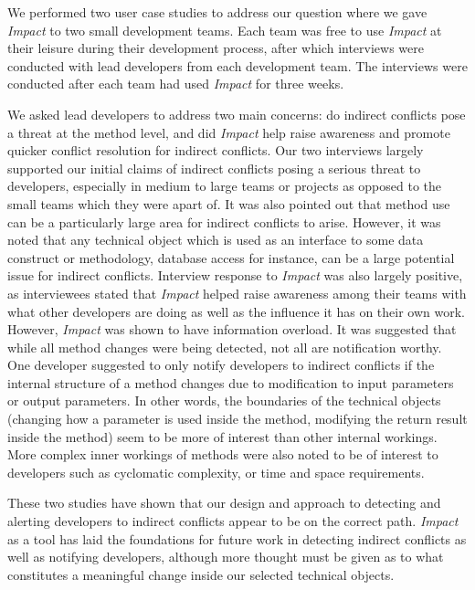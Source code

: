 \documentclass[conference]{IEEEtran}
\begin{document}
We performed two user case studies to address our question where
we gave \textit{Impact} to two small development teams. Each team was
free to use \textit{Impact} at their leisure during their development process,
after which interviews were conducted with lead developers from 
each development team. The interviews were conducted after each
team had used \textit{Impact} for three weeks.

We asked lead developers to address two main concerns: do indirect
conflicts pose a threat at the method level, and did \textit{Impact} help raise
awareness and promote quicker conflict resolution for indirect
conflicts. Our two interviews largely supported our initial claims of
indirect conflicts posing a serious threat to developers, especially
in medium to large teams or projects as opposed to the small
teams which they were apart of. It was also pointed
out that method use can be a particularly large area for indirect
conflicts to arise. However, it was noted that
any technical object which is used as an interface to some data
construct or methodology, database access for instance, can be 
a large potential issue for indirect conflicts.  Interview response to
\textit{Impact} was also largely positive, as interviewees stated that \textit{Impact}
helped raise awareness among their teams with what other developers
are doing as well as the influence it has on their own work. However,
\textit{Impact} was shown to have information overload. It was suggested
that while all method changes were being detected,
not all are notification worthy. One developer suggested to only notify
developers to indirect conflicts if the internal structure of a method
changes due to modification to input parameters or output parameters.
In other words, the boundaries of the technical objects (changing
how a parameter is used inside the method, modifying the return
result inside the method) seem to be more of interest than other 
internal workings. More complex inner workings of methods were also noted 
to be of interest to developers
such as cyclomatic complexity, or time and space requirements.

These two studies have shown that our design and approach to
detecting and alerting developers to indirect conflicts appear
to be on the correct path. \textit{Impact} as a tool has laid the foundations
for future work in detecting indirect conflicts as well as notifying
developers, although more thought must be given as to 
what constitutes a meaningful change inside our selected 
technical objects.
\end{document}
